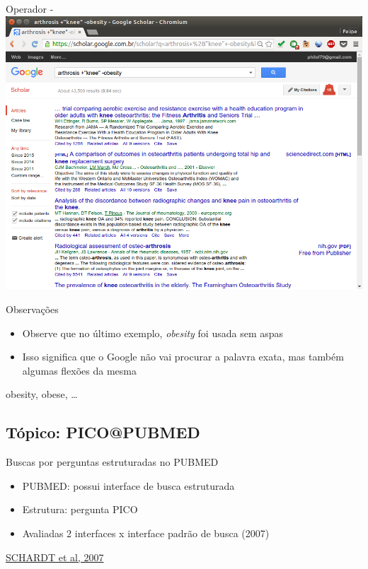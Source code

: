 \documentclass{beamer}
\begin{document}
\begin{frame}{Operador -}
  \centering
  \includegraphics[height=.85\textheight]{Busca/google-fu-plusminus}
\end{frame}

\begin{frame}{Observações}
  \begin{itemize}
    \footnotesize
  \item Observe que no último exemplo, {\em obesity} foi usada sem
    aspas
  \item Isso significa que o Google não vai procurar a palavra
    \alert{exata}, mas também algumas flexões da mesma
  \end{itemize}
  \begin{exampleblock}{}
    obesity, obese, \ldots
  \end{exampleblock}
\end{frame}

\subsection[PICO]{Tópico: PICO@PUBMED}

\begin{frame}{\footnotesize Buscas por perguntas estruturadas no PUBMED}
  \begin{itemize}
    \footnotesize
  \item PUBMED: possui interface de busca estruturada
    \bigskip
  \item Estrutura: pergunta PICO
    \bigskip
  \item Avaliadas 2 interfaces x interface padrão de busca (2007)
  \end{itemize}

  \vfill
  \tiny
  \hfill \href{https://doi.org/10.1186/1472-6947-7-16}{SCHARDT et al, 2007}
\end{frame}
\end{document}
